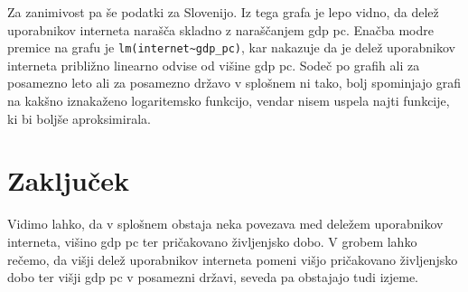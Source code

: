 \documentclass[11pt,a4paper]{article}
\begin{document}
\begin{figure}[h!] 
\begin{center}
 
 \end{center}
\end{figure}


\newpage
Za zanimivost pa še podatki za Slovenijo. Iz tega grafa je lepo vidno, da delež uporabnikov interneta narašča skladno z naraščanjem gdp pc. Enačba modre premice na grafu je \verb|lm(internet~gdp_pc)|, kar nakazuje da je delež uporabnikov interneta približno linearno odvise od višine gdp pc. Sodeč po grafih ali za posamezno leto ali za posamezno državo v splošnem ni tako, bolj spominjajo grafi na kakšno iznakaženo logaritemsko funkcijo, vendar nisem uspela najti funkcije, ki bi boljše aproksimirala. 

\begin{figure}[h!] 
\begin{center}
 
 \end{center}
\end{figure}

\newpage
\section{Zaključek}
Vidimo lahko, da v splošnem obstaja neka povezava med deležem uporabnikov interneta, višino gdp pc ter pričakovano življenjsko dobo. V grobem lahko rečemo, da višji delež uporabnikov interneta pomeni višjo pričakovano življenjsko dobo ter višji gdp pc v posamezni državi, seveda pa obstajajo tudi izjeme.
\end{document}
